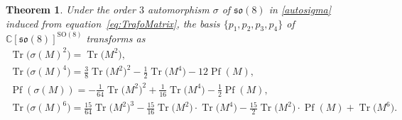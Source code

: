 \documentclass[pdftex]{sigma}
\numberwithin{equation}{section}
\newcommand{\Pf}{\operatorname{Pf}}
\newcommand{\Tr}{\operatorname{Tr}}
\newtheorem{Theorem}{Theorem}[section]
\begin{document}
\begin{Theorem}\label{prop:Trafo}
Under the order $3$ automorphism $\sigma$ of $\mathfrak{so}(8)$ in \eqref{autosigma} induced from equation~\eqref{eq:TrafoMatrix}, the basis $\{p_1 , p_2, p_3, p_4 \}$ of $\mathbb{C}[\mathfrak{so}(8)]^{\mathrm{SO}(8)}$ transforms as
 \begin{gather*}
\Tr\big(\sigma(M)^2\big) = \Tr\big(M^2\big), \\
\Tr\big(\sigma(M)^4\big) = \frac{3}{8} \Tr\big(M^2\big)^2 - \frac{1}{2} \Tr\big(M^4\big) -12 \Pf (M) , \\
\Pf (\sigma(M)) = - \frac{1}{64} \Tr\big(M^2\big)^2 + \frac{1}{16} \Tr\big(M^4\big) -\frac{1}{2} \Pf (M), \\
\Tr\big(\sigma(M)^6\big) = \frac{15}{64} \Tr\big(M^2\big)^3 - \frac{15}{16} \Tr\big(M^2\big) \cdot \Tr\big(M^4\big) - \frac{15}{2} \Tr\big(M^2\big) \cdot \Pf(M) + \Tr\big(M^6\big).
\end{gather*}
\end{Theorem}
\end{document}
